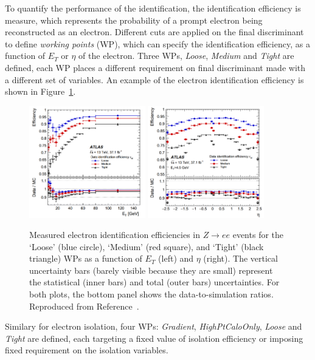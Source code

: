 To quantify the performance of the identification, 
the identification efficiency is measure, which represents the probability of
a prompt electron being reconstructed as an electron.
Different cuts are applied on the final discriminant
to define \textit{working points} (WP), which can specify 
the identification efficiency, as a function of $E_T$ or $\eta$ of the electron. 
Three WPs, \textit{Loose}, \textit{Medium} and \textit{Tight} are defined, 
each WP places a different requirement on final discriminant 
made with a different set of variables. 
An example of the electron identification efficiency 
is shown in Figure~\ref{fig:electron_ID}.
\begin{figure}[bht]
    \begin{centering}	
    \includegraphics[width=0.45\textwidth]{Reconstruction_plots/electrond_ID1.png}
    \includegraphics[width=0.45\textwidth]{Reconstruction_plots/electrond_ID2.png}
    \caption{Measured electron identification efficiencies in $Z \rightarrow ee$
    events for the `Loose' (blue circle), `Medium' (red square), 
    and `Tight' (black triangle) WPs as a function of $E_T$ (left) and $\eta$ (right). 
    The vertical uncertainty bars (barely visible because they are small) 
    represent the statistical (inner bars) and total (outer bars) uncertainties. 
    For both plots, the bottom panel shows the data-to-simulation
    ratios. Reproduced from Reference~\cite{PERF-2017-01}.}
    \label{fig:electron_ID}
    \end{centering}
\end{figure}
Similary for electron isolation, 
four WPs: \textit{Gradient}, \textit{HighPtCaloOnly}, \textit{Loose} and \textit{Tight} 
are defined, each targeting a fixed value of isolation efficiency
or imposing fixed requirement on the isolation variables. 

